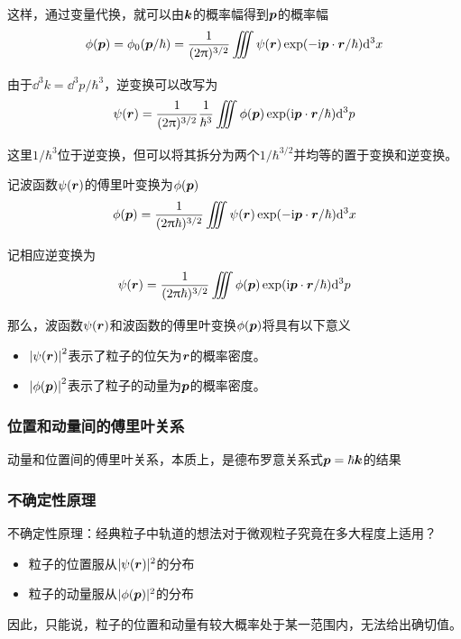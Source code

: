 \begin{frame}
    这样，通过变量代换，就可以由$\vb*{k}$的概率幅得到$\vb*{p}$的概率幅
    \begin{equation}
        \phi(\vb*{p})=
        \phi_0(\vb*{p}/\hbar)=
        \frac{1}{(2\pi)^{3/2}}\Itnt\psi(\vb*{r})
        \exp(-\i\vb*{p}\cdot\vb*{r}/\hbar)\dd^3x
    \end{equation}
    由于$\dd^3k=\dd^3p/\hbar^3$，逆变换可以改写为
    \begin{equation}
        \psi(\vb*{r})=\frac{1}{(2\pi)^{3/2}}\frac{1}{\hbar^3}\Itnt\phi(\vb*{p})\exp(\i\vb*{p}\cdot\vb*{r}/\hbar)\dd^3p
    \end{equation}
    这里$1/\hbar^3$位于逆变换，但可以将其拆分为两个$1/\hbar^{3/2}$并均等的置于变换和逆变换。
\end{frame}

\begin{frame}
    \begin{theorem}[波函数的傅里叶变换]
        \setlength{\parskip}{0pt}
        记波函数$\psi(\vb*{r})$的傅里叶变换为$\phi(\vb*{p})$
        \begin{equation}
            \phi(\vb*{p})=\frac{1}{(2\pi\hbar)^{3/2}}\Itnt\psi(\vb*{r})\exp(-\i\vb*{p}\cdot\vb*{r}/\hbar)\dd^3x
        \end{equation}
        记相应逆变换为
        \begin{equation}
            \psi(\vb*{r})=\frac{1}{(2\pi\hbar)^{3/2}}\Itnt\phi(\vb*{p})\exp(\i\vb*{p}\cdot\vb*{r}/\hbar)\dd^3p
        \end{equation}
        那么，波函数$\psi(\vb*{r})$和波函数的傅里叶变换$\phi(\vb*{p})$将具有以下意义
        \begin{itemize}
            \item $\abs{\psi(\vb*{r})}^2$表示了粒子的位矢为$\vb*{r}$的概率密度。
            \item $\abs{\phi(\vb*{p})}^2$表示了粒子的动量为$\vb*{p}$的概率密度。
        \end{itemize}
    \end{theorem}
\end{frame}

\begin{frame}
    \frametitle{位置和动量间的傅里叶关系}
    动量和位置间的傅里叶关系，本质上，是德布罗意关系式$\vb*{p}=\hbar\vb*{k}$的结果
\end{frame}

\begin{frame}
    \frametitle{不确定性原理}
    不确定性原理：经典粒子中轨道的想法对于微观粒子究竟在多大程度上适用？

    \begin{itemize}
        \item 粒子的位置服从$|\psi(\vb*{r})|^2$的分布
        \item 粒子的动量服从$|\phi(\vb*{p})|^2$的分布
    \end{itemize}
    因此，只能说，粒子的位置和动量有较大概率处于某一范围内，无法给出确切值。
\end{frame}

